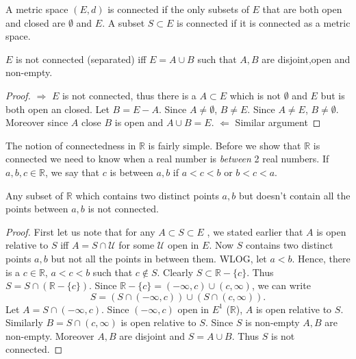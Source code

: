 \begin{Definition}
    A metric space $(E,d)$ is connected if the only subsets of $E$ that are both open and closed
    are $\emptyset$ and $E$. A subset $S \subset E$ is connected if it is connected as a metric
    space.
\end{Definition}

\begin{Theorem}[name=Connectedness of a metric space]
    $E$ is not connected (separated) iff $E = A \cup B$ such that $A,B$ are disjoint,open and
    non-empty.\end{Theorem}
\begin{proof}
     

    $\Rightarrow$ $E$ is not connected, thus there is a $A \subset E$ which is not $\emptyset$ and 
    $E$ but is both open an closed. Let $B = E - A$. Since $A \neq \emptyset$, $B \neq E$. Since $A
    \neq E$, $B \neq \emptyset$. Moreover since $A$ close $B$ is open and $A \cup B = E$.
    $\Leftarrow$ Similar argument
\end{proof}
The notion of connectedness in $\mathbb{R}$ is fairly simple. Before we show that $\mathbb{R}$ is
connected we need to know when a real number is \emph{between} 2 real numbers. If $a,b,c \in 
\mathbb{R}$, we say that $c$ is between $a,b$ if $a < c < b$ or $b < c < a$.
\begin{Proposition}[name=Connectedness of open segments in $\mathbb{R}$]
    Any subset of $\mathbb{R}$ which contains two distinct points $a,b$ but doesn't contain all the
    points between $a,b$ is not connected.
\end{Proposition}
\begin{proof}
    First let us note that for any $A \subset S \subset E$ , we stated earlier that $A$ is open
    relative to $S$ iff $A = S \cap \mathcal{U}$ for some $\mathcal{U}$ open in $E$. Now $S$
    contains two distinct points $a,b$ but not all the points in between them. WLOG, let $a < b$.
    Hence, there is a $c \in \mathbb{R}$, $a < c < b$ such that $c \not \in S$. Clearly $S \subset \mathbb{R} -
    \lbrace c \rbrace$. Thus $S = S \cap \left( \mathbb{R} - \lbrace c \rbrace \right)$. Since
    $\mathbb{R} - \lbrace c \rbrace = \left(-\infty,c\right) \cup \left(c,\infty\right)$, we can
    write \[ S = \left(S \cap \left(-\infty,c\right) \right) \cup \left(S \cap
	    \left(c,\infty\right)\right).\]
    Let $A = S \cap \left(-\infty,c\right)$. Since $\left(-\infty,c\right)$ open in $E^1$ 
    ($\mathbb{R}$), $A$ is open relative to $S$. Similarly $B = S \cap \left(c,\infty\right)$ is
    open relative to $S$. Since $S$ is non-empty $A,B$ are non-empty. Moreover $A,B$ are disjoint
    and $S = A \cup B$. Thus $S$ is not connected.
\end{proof}
